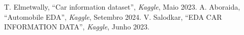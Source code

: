 \documentclass[conference]{IEEEtran}
\begin{document}
\begin{thebibliography}{1}
     T. Elmetwally, “Car information dataset”, \textit{Kaggle}, Maio 2023.
     A. Aboraida, “Automobile EDA”, \textit{Kaggle}, Setembro 2024.
     V. Salodkar, “EDA CAR INFORMATION DATA”, \textit{Kaggle}, Junho 2023.
\end{thebibliography}
\end{document}
